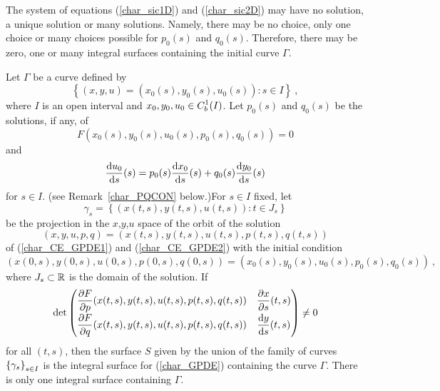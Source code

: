 \begin{rmk}
The system of equations (\ref{char_sic1D}) and (\ref{char_sic2D}) may
have no solution, a unique solution or many solutions.  Namely,
there may be no choice, only one choice or many choices possible for
$p_0(s)$ and $q_0(s)$.  Therefore, there may be zero, one or many
integral surfaces containing the initial curve $\Gamma$.
\end{rmk}

\begin{theorem}
Let $\Gamma$ be a curve defined by
\[
\left\{ (x,y,u) = \left(x_0(s), y_0(s),u_0(s)\right) : s\in I \right\} \ ,
\]
where $I$ is an open interval and $\displaystyle x_0, y_0, u_0 \in C_b^1(I)$.
Let $p_0(s)$ and $q_0(s)$ be the solutions, if any, of
\begin{equation} \label{char_idxIN1}
F\left( x_0(s), y_0(s), u_0(s), p_0(s), q_0(s)\right) = 0
\end{equation}
and
\begin{equation} \label{char_idxIN2}
\frac{\mathrm{d}u_0}{\mathrm{d}{s}}(s) = p_0(s)\frac{\mathrm{d}x_0}{\mathrm{d}{s}}(s)+ q_0(s)\frac{\mathrm{d}y_0}{\mathrm{d}{s}}(s)
\end{equation}
for $s\in I$.  (see Remark~\ref{char_PQCON} below.)\quad For $s \in I$
fixed, let
\[
\gamma_s = \left\{ \left(x(t,s), y(t,s), u(t,s) \right) : t \in J_s \right\}
\]
be the projection in the $x$,$y$,$u$ space of the orbit of the solution
\[
(x,y,u,p,q) = \left(x(t,s), y(t,s), u(t,s), p(t,s), q(t,s) \right)
\]
of (\ref{char_CE_GPDE1}) and (\ref{char_CE_GPDE2}) with the initial
condition
\begin{equation} \label{char_init_GPDE}
(x(0,s),y(0,s),u(0,s),p(0,s),q(0,s))
= \left(x_0(s), y_0(s), u_0(s), p_0(s), q_0(s) \right) \ ,
\end{equation}
where $J_s \subset \mathbb{R}$ is the domain of the solution.  If
\begin{equation} \label{char_GPDE_cond}
\det
\begin{pmatrix}
\displaystyle \frac{\partial{F}}{\partial p}(x(t,s),y(t,s),u(t,s),p(t,s),q(t,s)) &
\displaystyle \frac{\partial{x}}{\partial s}(t,s) \\[0.7em]
\displaystyle \frac{\partial{F}}{\partial q}(x(t,s),y(t,s),u(t,s),p(t,s),q(t,s)) &
\displaystyle \frac{\mathrm{d}y}{\mathrm{d}{s}}(t,s)
\end{pmatrix} \neq 0
\end{equation}
for all $(t,s)$, then the surface $S$ given by the union of the family
of curves $\displaystyle \left\{ \gamma_s \right\}_{s\in I}$ is the
integral surface for (\ref{char_GPDE}) containing the curve
$\Gamma$.  There is only one integral surface containing $\Gamma$.
\end{theorem}

